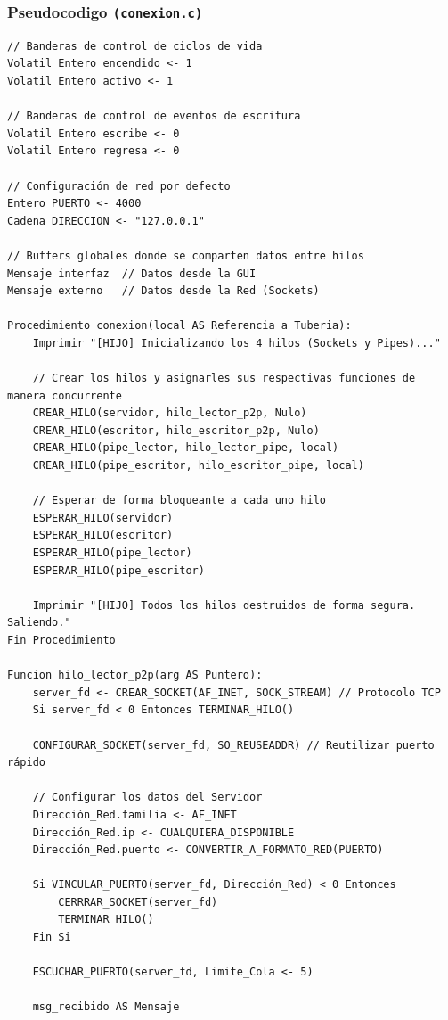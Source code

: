 \subsubsection{\large Pseudocodigo \texttt{(conexion.c)}}
\begin{lstlisting}[style=estiloPseudo]
// Banderas de control de ciclos de vida
Volatil Entero encendido <- 1
Volatil Entero activo <- 1

// Banderas de control de eventos de escritura
Volatil Entero escribe <- 0
Volatil Entero regresa <- 0

// Configuración de red por defecto
Entero PUERTO <- 4000
Cadena DIRECCION <- "127.0.0.1"

// Buffers globales donde se comparten datos entre hilos
Mensaje interfaz  // Datos desde la GUI
Mensaje externo   // Datos desde la Red (Sockets)

Procedimiento conexion(local AS Referencia a Tuberia):
    Imprimir "[HIJO] Inicializando los 4 hilos (Sockets y Pipes)..."
    
    // Crear los hilos y asignarles sus respectivas funciones de manera concurrente
    CREAR_HILO(servidor, hilo_lector_p2p, Nulo)
    CREAR_HILO(escritor, hilo_escritor_p2p, Nulo)
    CREAR_HILO(pipe_lector, hilo_lector_pipe, local)
    CREAR_HILO(pipe_escritor, hilo_escritor_pipe, local)

    // Esperar de forma bloqueante a cada uno hilo
    ESPERAR_HILO(servidor)
    ESPERAR_HILO(escritor)
    ESPERAR_HILO(pipe_lector)
    ESPERAR_HILO(pipe_escritor)

    Imprimir "[HIJO] Todos los hilos destruidos de forma segura. Saliendo."
Fin Procedimiento

Funcion hilo_lector_p2p(arg AS Puntero):
    server_fd <- CREAR_SOCKET(AF_INET, SOCK_STREAM) // Protocolo TCP
    Si server_fd < 0 Entonces TERMINAR_HILO()

    CONFIGURAR_SOCKET(server_fd, SO_REUSEADDR) // Reutilizar puerto rápido
    
    // Configurar los datos del Servidor
    Dirección_Red.familia <- AF_INET
    Dirección_Red.ip <- CUALQUIERA_DISPONIBLE
    Dirección_Red.puerto <- CONVERTIR_A_FORMATO_RED(PUERTO)

    Si VINCULAR_PUERTO(server_fd, Dirección_Red) < 0 Entonces
        CERRRAR_SOCKET(server_fd)
        TERMINAR_HILO()
    Fin Si

    ESCUCHAR_PUERTO(server_fd, Limite_Cola <- 5)

    msg_recibido AS Mensaje


\end{lstlisting}
